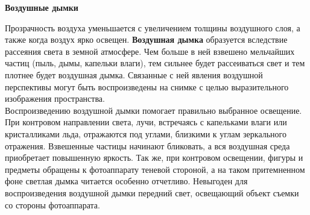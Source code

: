\documentclass{article}
\newcommand{\important}[1]{\textbf{#1}}
\renewcommand{\subsection}[1]{
	\vspace{2em}
	\begin{flushright}
		\large
		\textbf{#1}
	\end{flushright}
}
\begin{document}
\subsection{Воздушные дымки}
Прозрачность воздуха уменьшается с увеличением толщины воздушного слоя, а также когда воздух ярко освещен. \important{Воздушная дымка} образуется вследствие рассеяния света в земной атмосфере. Чем больше в ней взвешено мельчайших частиц (пыль, дымы, капельки влаги), тем сильнее будет рассеиваться свет и тем плотнее будет воздушная дымка. Связанные с ней явления воздушной перспективы могут быть воспроизведены на снимке с целью выразительного изображения пространства.\\
Воспроизведению воздушной дымки помогает правильно выбранное освещение. При контровом направлении света, лучи, встречаясь с капельками влаги или кристалликами льда, отражаются под углами, близкими к углам зеркального отражения. Взвешенные частицы начинают бликовать, а вся воздушная среда приобретает повышенную яркость. Так же, при контровом освещении, фигуры и предметы обращены к фотоаппарату теневой стороной, а на таком притемненном фоне светлая дымка читается особенно отчетливо. Невыгоден для воспроизведения воздушной дымки передний свет, освещающий объект съемки со стороны фотоаппарата.
\end{document}
